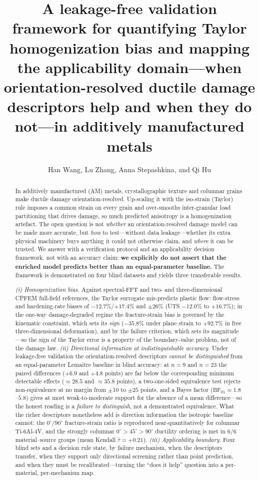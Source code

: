 \documentclass[twocolumn]{sagej}
\title{A leakage-free validation framework for quantifying Taylor homogenization bias and mapping the applicability domain---when orientation-resolved ductile damage descriptors help and when they do not---in additively manufactured metals}
\author{Han Wang\affilnum{1,*}, Lu Zhang\affilnum{1}, Anna Stepashkina\affilnum{1}, and Qi Hu\affilnum{2}}
\affiliation{\affilnum{1}Zhejiang Lab, 2880 Wenyi West Rd, Hangzhou 311121, China\\ \affilnum{2}Department of Plasticity Technology, School of Materials Science and Engineering, Shanghai Jiao Tong University, Shanghai 200030, PR China}
\begin{document}
\begin{abstract}

In additively manufactured (AM) metals, crystallographic texture and columnar grains make ductile damage orientation-resolved. Up-scaling it with the iso-strain (Taylor) rule imposes a common strain on every grain and over-smooths inter-granular load partitioning that drives damage, so much predicted anisotropy is a homogenization artefact. The open question is not \emph{whether} an orientation-resolved damage model can be made more accurate, but \emph{how} to test---without data leakage---whether its extra physical machinery buys anything it could not otherwise claim, and \emph{where} it can be trusted. We answer with a verification protocol and an applicability decision framework, not with an accuracy claim: \textbf{we explicitly do not assert that the enriched model predicts better than an equal-parameter baseline.} The framework is demonstrated on four blind datasets and yields three transferable results.

\emph{(i) Homogenization bias.} Against spectral-FFT and two- and three-dimensional CPFEM full-field references, the Taylor surrogate mis-predicts plastic flow: flow-stress and hardening-rate biases of $-12.7\%$/$+17.4\%$ and $\pm26\%$ (UTS $-12.0\%$ to $+16.7\%$); in the one-way damage-degraded regime the fracture-strain bias is governed by the kinematic constraint, which sets its \emph{sign} ($-35.8\%$ under plane strain to $+92.7\%$ in free three-dimensional deformation), and by the failure criterion, which sets its magnitude---so the sign of the Taylor error is a property of the boundary-value problem, not of the damage law. \emph{(ii) Directional information at indistinguishable accuracy.} Under leakage-free validation the orientation-resolved descriptors \emph{cannot be distinguished} from an equal-parameter Lemaitre baseline in blind accuracy: at $n=9$ and $n=23$ the paired differences ($+6.9$ and $+4.8$ points) are far below the corresponding minimum detectable effects ($\approx28.5$ and $\approx35.8$ points), a two-one-sided equivalence test rejects non-equivalence at no margin from $\pm10$ to $\pm25$ points, and a Bayes factor ($\mathrm{BF}_{01}\approx1.8$--$5.8$) gives at most weak-to-moderate support for the absence of a mean difference---so the honest reading is a \emph{failure to distinguish}, not a demonstrated equivalence. What the richer descriptors nonetheless add is direction information the isotropic baseline cannot: the $0^\circ/90^\circ$ fracture-strain ratio is reproduced near-quantitatively for columnar Ti-6Al-4V, and the strongly columnar $0^\circ\!>\!45^\circ\!>\!90^\circ$ ductility ordering is met in $6/6$ material--source groups (mean Kendall $\bar\tau=+0.21$). \emph{(iii) Applicability boundary.} Four blind sets and a decision rule state, by failure mechanism, when the descriptors transfer, when they support only directional screening rather than point prediction, and when they must be recalibrated---turning the ``does it help'' question into a per-material, per-mechanism map.
\end{abstract}
\end{document}

